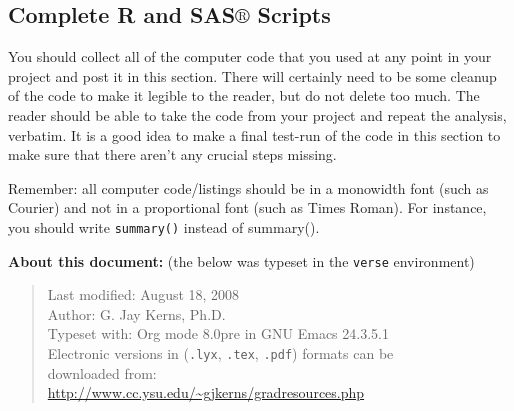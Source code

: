 \documentclass[11pt]{article}
\begin{document}
\subsection[Complete R and SAS\(\circledR\) Scripts]{Complete R and SAS\(\circledR\) Scripts}
\label{sec-7-2}

You should collect all of the computer code that you used at any point
in your project and post it in this section. There will certainly need
to be some cleanup of the code to make it legible to the reader, but
do not delete too much. The reader should be able to take the code
from your project and repeat the analysis, verbatim. It is a good idea
to make a final test-run of the code in this section to make sure that
there aren't any crucial steps missing.

Remember: all computer code/listings should be in a monowidth font
(such as Courier) and not in a proportional font (such as Times
Roman). For instance, you should write \texttt{summary()} instead of summary().





\textbf{About this document:} (the below was typeset in the \texttt{verse}
  environment)

\begin{verse}
Last modified: August 18, 2008 \\
Author: G. Jay Kerns, Ph.D. \\
Typeset with: Org mode 8.0pre in GNU Emacs 24.3.5.1 \\
Electronic versions in (\texttt{.lyx}, \texttt{.tex}, \texttt{.pdf}) formats can be \\
downloaded from: \\
\url{http://www.cc.ysu.edu/~gjkerns/gradresources.php} \\
\end{verse}
\end{document}
